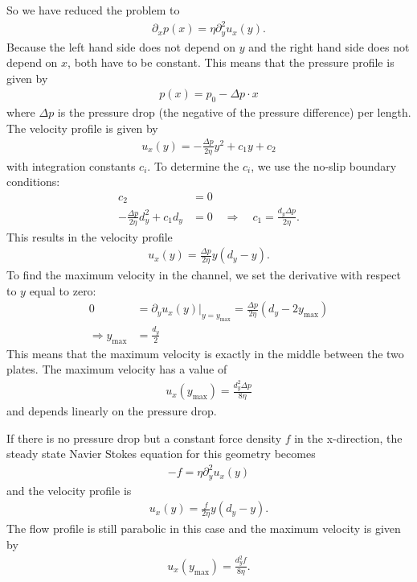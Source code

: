 \documentclass[a4paper,10pt,bibtotoc]{scrartcl}
\begin{document}
So we have reduced the problem to
\begin{align}
 \partial_x p(x) = \eta\partial_y^2 u_x(y).
\end{align}
Because the left hand side does not depend on $y$ and the right hand side does not depend on $x$, both have to be constant. This means that the pressure profile is given by
\begin{align}
 p(x) = p_0 - \Delta p\cdot x
\end{align}
where $\Delta p$ is the pressure drop (the negative of the pressure difference) per length. The velocity profile is given by
\begin{align}
 u_x(y) = -\frac{\Delta p}{2\eta} y^2 + c_1 y + c_2
\end{align}
with integration constants $c_i$. To determine the $c_i$, we use the no-slip boundary conditions:
\begin{align}
 c_2 &= 0\\
 -\frac{\Delta p}{2\eta} d_y^2 + c_1 d_y &= 0\quad\Rightarrow\quad c_1 =\frac{d_y\Delta p}{2\eta}.
\end{align}
This results in the velocity profile 
\begin{align}
 u_x(y) = \frac{\Delta p}{2\eta}y\left(d_y - y\right).
\end{align}
To find the maximum velocity in the channel, we set the derivative with respect to $y$ equal to zero:
\begin{align}
 0 &= \partial_y u_x(y)\bigg\vert_{y = y_\mathrm{max}} = \frac{\Delta p}{2\eta}\left(d_y - 2y_\mathrm{max}\right)\\
 \Rightarrow y_\mathrm{max} &= \frac{d_y}{2}
\end{align}
This means that the maximum velocity is exactly in the middle between the two plates. The maximum velocity has a value of
\begin{align}
 u_x(y_\mathrm{max}) =\frac{d_y^2\Delta p}{8\eta}
\end{align}
and depends linearly on the pressure drop. 

If there is no pressure drop but a constant force density $f$ in the x-direction, the steady state Navier Stokes equation for this geometry becomes
\begin{align}
 -f = \eta\partial_y^2 u_x(y)
\end{align}
and the velocity profile is
\begin{align}
 u_x(y) = \frac{f}{2\eta}y\left(d_y - y\right).
\end{align}
The flow profile is still parabolic in this case and the maximum velocity is given by
\begin{align}
 u_x(y_\mathrm{max}) =\frac{d_y^2 f}{8\eta}.
\end{align}
\end{document}

